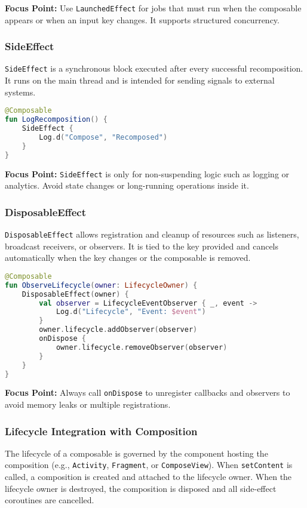 \documentclass[a4paper,12pt]{article}
\begin{document}
\textbf{Focus Point:} Use \texttt{LaunchedEffect} for jobs that must run when the composable appears or when an input key changes. It supports structured concurrency.

\subsubsection{SideEffect}

\texttt{SideEffect} is a synchronous block executed after every successful recomposition. It runs on the main thread and is intended for sending signals to external systems.

\begin{lstlisting}[language=Kotlin]
@Composable
fun LogRecomposition() {
    SideEffect {
        Log.d("Compose", "Recomposed")
    }
}
\end{lstlisting}

\textbf{Focus Point:} \texttt{SideEffect} is only for non-suspending logic such as logging or analytics. Avoid state changes or long-running operations inside it.

\subsubsection{DisposableEffect}

\texttt{DisposableEffect} allows registration and cleanup of resources such as listeners, broadcast receivers, or observers. It is tied to the key provided and cancels automatically when the key changes or the composable is removed.

\begin{lstlisting}[language=Kotlin]
@Composable
fun ObserveLifecycle(owner: LifecycleOwner) {
    DisposableEffect(owner) {
        val observer = LifecycleEventObserver { _, event -> 
            Log.d("Lifecycle", "Event: $event")
        }
        owner.lifecycle.addObserver(observer)
        onDispose {
            owner.lifecycle.removeObserver(observer)
        }
    }
}
\end{lstlisting}

\textbf{Focus Point:} Always call \texttt{onDispose} to unregister callbacks and observers to avoid memory leaks or multiple registrations.

\subsubsection{Lifecycle Integration with Composition}

The lifecycle of a composable is governed by the component hosting the composition (e.g., \texttt{Activity}, \texttt{Fragment}, or \texttt{ComposeView}). When \texttt{setContent} is called, a composition is created and attached to the lifecycle owner. When the lifecycle owner is destroyed, the composition is disposed and all side-effect coroutines are cancelled.
\end{document}
